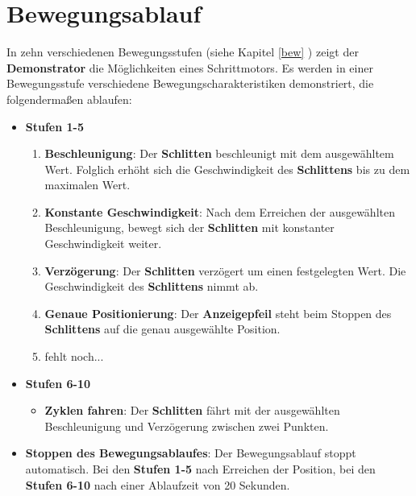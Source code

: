 
\chapter{Bewegungsablauf}

In zehn verschiedenen Bewegungsstufen (siehe Kapitel \ref{bew} ) zeigt der \textbf{Demonstrator} die Möglichkeiten eines Schrittmotors. Es werden in einer Bewegungsstufe verschiedene Bewegungscharakteristiken demonstriert, die folgendermaßen ablaufen:  

\begin{itemize}
	\item \textbf{Stufen 1-5}
	\begin{enumerate}
		\item\textbf{Beschleunigung}: Der \textbf{Schlitten} beschleunigt mit dem ausgewähltem Wert. Folglich erhöht sich die Geschwindigkeit des \textbf{Schlittens} bis zu dem maximalen Wert. 
		\item\textbf{Konstante Geschwindigkeit}: Nach dem Erreichen der ausgewählten Beschleunigung, bewegt sich der \textbf{Schlitten} mit konstanter Geschwindigkeit weiter.
		\item\textbf{Verzögerung}: Der \textbf{Schlitten} verzögert um einen festgelegten Wert. Die Geschwindigkeit des \textbf{Schlittens} nimmt ab.
		\item\textbf{Genaue Positionierung}: Der \textbf{Anzeigepfeil} steht beim Stoppen des \textbf{Schlittens} auf die genau ausgewählte Position.
		\item fehlt noch...
	\end{enumerate}
\end{itemize}
\begin{itemize}	
	\item \textbf{Stufen 6-10}
	\begin{itemize}
		\item\textbf{Zyklen fahren}: Der \textbf{Schlitten} fährt mit der ausgewählten Beschleunigung und Verzögerung zwischen zwei Punkten.
	\end{itemize}			
\item \textbf{Stoppen des Bewegungsablaufes}: Der Bewegungsablauf stoppt automatisch. Bei den \textbf{Stufen 1-5} nach Erreichen der Position, bei den \textbf{ Stufen 6-10} nach einer Ablaufzeit von 20 Sekunden.
\end{itemize}
